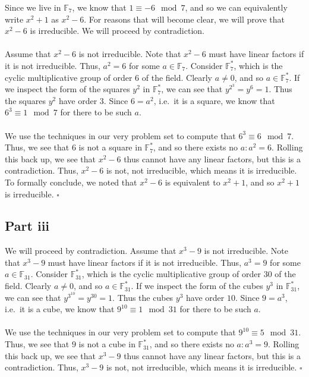 \documentclass[letterpaper]{article}
\newcommand*{\QED}{\hfill\ensuremath{\square}}%
\begin{document}
Since we live in $ \mathbb{F}_{7} $, we know that $ 1 \equiv -6 \mod{7} $, and so we can equivalently write $ x^2 + 1 $ as $ x^2 - 6 $.
For reasons that will become clear, we will prove that $ x^2 - 6 $ is irreducible.
We will proceed by contradiction.
\\ \\
Assume that $ x^2 - 6 $ is not irreducible.
Note that $ x^2 - 6 $ must have linear factors if it is not irreducible.
Thus, $ a^2 = 6 $ for some $ a \in \mathbb{F}_{7} $.
Consider $ \mathbb{F}^{*}_{7} $, which is the cyclic multiplicative group of order $ 6 $ of the field.
Clearly $ a \neq 0 $, and so $ a \in \mathbb{F}^{*}_{7} $.
If we inspect the form of the squares $ y^2 $ in $ \mathbb{F}^{*}_{7} $, we can see that $ y^{2^{3}} = y^{6} = 1 $.
Thus the squares $ y^2 $ have order $ 3 $.
Since $ 6 = a^2 $, i.e.\ it is a square, we know that $ 6^{3} \equiv 1 \mod{7} $ for there to be such $ a $.
\\ \\
We use the techniques in our very problem set to compute that $ 6^{3} \equiv 6 \mod{7} $.
Thus, we see that $ 6 $ is not a square in $ \mathbb{F}^{*}_{7} $, and so there exists no $ a : a^2 = 6 $.
Rolling this back up, we see that $ x^2 - 6 $ thus cannot have any linear factors, but this is a contradiction.
Thus, $ x^2 - 6 $ is not, not irreducible, which means it is irreducible.
To formally conclude, we noted that $ x^2 - 6 $ is equivalent to $ x^2 + 1 $, and so $ x^2 + 1 $ is irreducible.
\QED{}

\subsection{Part iii}
\label{subs:6Partiii}

We will proceed by contradiction.
Assume that $ x^3 - 9 $ is not irreducible.
Note that $ x^3 - 9 $ must have linear factors if it is not irreducible.
Thus, $ a^3 = 9 $ for some $ a \in \mathbb{F}_{31} $.
Consider $ \mathbb{F}^{*}_{31} $, which is the cyclic multiplicative group of order $ 30 $ of the field.
Clearly $ a \neq 0 $, and so $ a \in \mathbb{F}^{*}_{31} $.
If we inspect the form of the cubes $ y^3 $ in $ \mathbb{F}^{*}_{31} $, we can see that $ y^{3^{10}} = y^{30} = 1 $.
Thus the cubes $ y^3 $ have order $ 10 $.
Since $ 9 = a^3 $, i.e.\ it is a cube, we know that $ 9^{10} \equiv 1 \mod{31} $ for there to be such $ a $.
\\ \\
We use the techniques in our very problem set to compute that $ 9^{10} \equiv 5 \mod{31} $.
Thus, we see that $ 9 $ is not a cube in $ \mathbb{F}^{*}_{31} $, and so there exists no $ a : a^3 = 9 $.
Rolling this back up, we see that $ x^3 - 9 $ thus cannot have any linear factors, but this is a contradiction.
Thus, $ x^3 - 9 $ is not, not irreducible, which means it is irreducible.
\QED{}
\end{document}
